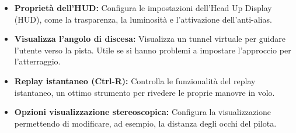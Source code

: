 \begin{itemize}
{\begin{itemize}
  modifiche del punto di vista effettuate con il mouse (vedi sopra).
  \item \textbf{Propriet\`{a} dell'HUD:} Configura le impostazioni dell'Head Up Display (HUD), come la trasparenza, la luminosit\`{a} e l'attivazione dell'anti-alias.
  \item \textbf{Visualizza l'angolo di discesa:} Visualizza un tunnel virtuale per guidare l'utente verso la pista. Utile se si hanno problemi a impostare l'approccio per l'atterraggio.
  \item \textbf{Replay istantaneo (Ctrl-R):} Controlla le funzionalit\`{a} del replay istantaneo, un ottimo strumento per rivedere le proprie manovre in volo.
   \item \textbf{Opzioni visualizzazione stereoscopica:} Configura la visualizzazione permettendo di modificare, ad esempio, la distanza degli occhi del pilota.
  \end{itemize}
}{}


\end{itemize}
